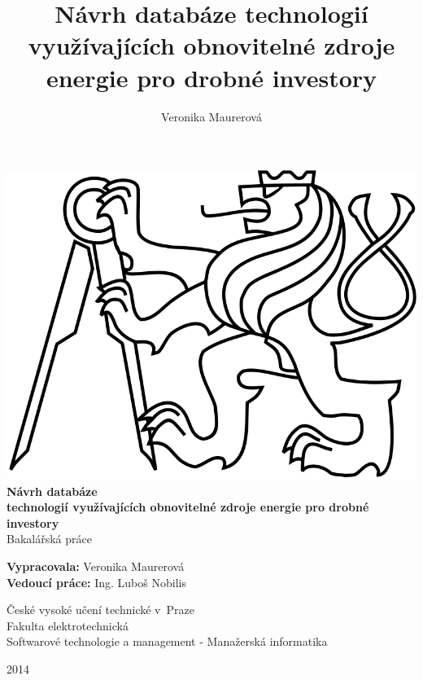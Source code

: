 \documentclass[11pt,a4paper]{article}
\author{Veronika Maurerová}
\title{Návrh databáze technologií využívajících obnovitelné zdroje energie pro drobné investory}
\begin{document}
\thispagestyle{empty}
\vspace*{1cm}
\begin{center}
\includegraphics[scale=1]{lev}\\
\vspace*{1cm}
{\fontsize{25}{25}\textbf{Návrh databáze}}\\
\vspace{0.3cm}
{\fontsize{25}{25}\textbf{technologií využívajících obnovitelné zdroje energie pro drobné investory}}\\
\vspace{2cm}
{\noindent\fontsize{25}{25} \selectfont Bakalářská práce}\\
\vspace*{2cm}
\begin{large}
\textbf{Vypracovala:} Veronika Maurerová\\
\vspace{0.3cm}
\textbf{Vedoucí práce:} Ing. Luboš Nobilis\\
\end{large}
\vspace{7cm}
\begin{large}
České vysoké učení technické v~Praze\\
Fakulta elektrotechnická\\
Softwarové technologie a management - Manažerská informatika
\end{large}

\vspace{1cm}

2014
\end{center}
\newpage
\end{document}

